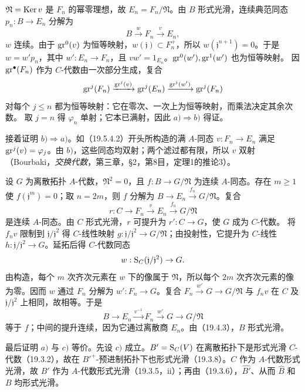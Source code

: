 $\mathfrak N=\operatorname{Ker} v$ 是 $F_n$ 的幂零理想，故 $E_n=F_n/\mathfrak N$。由 $B$ 形式光滑，连续典范同态 $p_n:B\to E_n$ 分解为
\[
 B\xrightarrow{w}F_n\xrightarrow{v}E_n,
\]
$w$ 连续。由于 $\operatorname{gr}^0(v)$ 为恒等映射，$w(\mathfrak j)\subset F_n^+$，所以 $w(\mathfrak j^{n+1})=0$。于是 $w=w' p_n$，其中 $w':E_n\to F_n$，且 $vw'=1_{E_n}$。$\operatorname{gr}^0(w'),\operatorname{gr}^1(w')$ 也为恒等映射。
因 $\operatorname{gr}^\bullet(F_n)$ 作为 $C$-代数由一次部分生成，复合
\[
 \operatorname{gr}^j(F_n)\xrightarrow{\operatorname{gr}^j(v)}\operatorname{gr}^j(E_n)
       \xrightarrow{\operatorname{gr}^j(w')}\operatorname{gr}^j(F_n)
\]
对每个 $j\leq n$ 都为恒等映射：它在零次、一次上为恒等映射，而乘法决定其余次数。
取 $j=n$ 得 $\varphi_n$ 单射；它本已满射，因此 $a)\Rightarrow b)$ 得证。

接着证明 $b)\Rightarrow a)$。如（19.5.4.2）开头所构造的满 $A$-同态 $v:F_n\to E_n$ 满足 $\operatorname{gr}^j(v)=\varphi_j$。由 $b)$，这些同态均双射；两个滤过都有限，所以 $v$ 双射（Bourbaki，\textit{交换代数}，第三章，§2，第8目，定理1的推论3）。

设 $G$ 为离散拓扑 $A$-代数，$\mathfrak N^2=0$，且 $f:B\to G/\mathfrak N$ 为连续 $A$-同态。存在 $m\geq1$ 使 $f(\mathfrak j^m)=0$；取 $n=2m$，则 $f$ 分解为 $B\to E_n\xrightarrow{f_n}G/\mathfrak N$。复合
\[
 r:C\longrightarrow F_n\xrightarrow{v}E_n\xrightarrow{f_n}G/\mathfrak N
\]
是连续 $A$-同态。由 $C$ 形式光滑，$r$ 可提升为 $r':C\to G$，使 $G$ 成为 $C$-代数。
将 $f_n v$ 限制到 $\mathfrak j/\mathfrak j^2$ 得 $C$-线性映射 $g:\mathfrak j/\mathfrak j^2\to G/\mathfrak N$；由投射性，它提升为 $C$-线性 $h:\mathfrak j/\mathfrak j^2\to G$。延拓后得 $C$-代数同态
\[
 w:\mathrm S_C(\mathfrak j/\mathfrak j^2)\to G.
\]
由构造，每个 $m$ 次齐次元素在 $w$ 下的像属于 $\mathfrak N$，所以每个 $2m$ 次齐次元素的像为零。因而 $w$ 通过 $F_n$ 分解为 $w':F_n\to G$。复合 $F_n\xrightarrow{w'}G\to G/\mathfrak N$ 与 $f_n v$ 在 $C$ 及 $\mathfrak j/\mathfrak j^2$ 上相同，故相等。于是
\[
 B\longrightarrow E_n\xrightarrow{v^{-1}}F_n\xrightarrow{w'}G\longrightarrow G/\mathfrak N
\]
等于 $f$；中间的提升连续，因为它通过离散商 $E_n$。由（19.4.3），$B$ 形式光滑。

最后证明 $a)$ 与 $c)$ 等价。先设 $c)$ 成立。$B'=\mathrm S_C(V)$ 在离散拓扑下是形式光滑 $C$-代数（19.3.2），故在 $B'^+$-预进制拓扑下也形式光滑（19.3.8）。$C$ 作为 $A$-代数形式光滑，故 $B'$ 作为 $A$-代数形式光滑（19.3.5，ii）；再由（19.3.6），$\widehat{B'}$、从而 $\widehat B$ 和 $B$ 均形式光滑。


